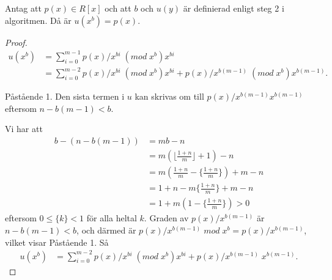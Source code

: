 \begin{lemma}
 Antag att $p(x) \in R[x]$ och att $b$ och $u(y)$ är definierad enligt steg 2 i algoritmen. Då är $u(x^b)=p(x)$.
\end{lemma}
\begin{proof}


\begin{align*}
u(x^b) &= \sum_{i = 0}^{m-1} p(x)/x^{bi} \; (mod \; x^b) x^{bi} \\
&= \sum_{i = 0}^{m-2} p(x)/x^{bi} \; (mod \; x^b) x^{bi} + p(x)/x^{b(m-1)} \; (mod \; x^b) x^{b(m-1)}.
\end{align*}

Påstående 1. Den sista termen i $u$ kan skrivas om till $p(x)/x^{b(m-1)} x^{b(m-1)}$ eftersom $n - b(m-1) < b$.

Vi har att
\begin{align*}
 b - (n - b(m-1)) &= m b - n \\
&= m (\lfloor \frac{1 + n}{m}\rfloor + 1) - n \\
&= m( \frac{1 + n}{m} -\{ \frac{1 + n}{m}\} ) + m - n \\
&= 1 + n - m \{ \frac{1 + n}{m}\} + m - n \\
&= 1 + m(1 - \{ \frac{1 + n}{m}\}) > 0
\end{align*}
eftersom $0 \leq \{ k \} < 1$ för alla heltal $k$. Graden av $p(x)/x^{b(m-1)}$ är $n - b(m-1) < b$,
och därmed är $p(x)/x^{b(m-1)} \; mod \; x^b = p(x)/x^{b(m-1)}$, vilket visar Påstående 1. Så
\begin{align*}
u(x^b) &= \sum_{i = 0}^{m-2} p(x)/x^{bi} \; (mod \; x^b) x^{bi} + p(x)/x^{b(m-1)} \; x^{b(m-1)}.
\end{align*}
\end{proof}
